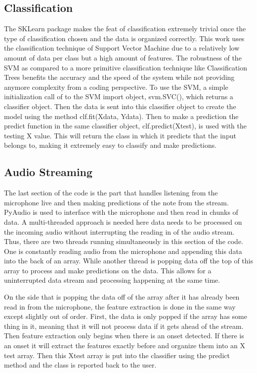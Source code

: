 \documentclass[conference]{IEEEtran}
\begin{document}
\subsection{Classification}
\label{sec:class}

The SKLearn package makes the feat of classification extremely trivial once the type of classification chosen and the data is organized correctly.  This work uses the classification technique of Support Vector Machine due to a relatively low amount of data per class but a high amount of features.  The robustness of the SVM as compared to a more primitive classification technique like Classification Trees benefits the accuracy and the speed of the system while not providing anymore complexity from a coding perspective.  To use the SVM, a simple initialization call of to the SVM import object, svm.SVC(), which returns a classifier object.  Then the data is sent into this classifier object to create the model using the method clf.fit(Xdata, Ydata).  Then to make a prediction the predict function in the same classifier object, clf.predict(Xtest), is used with the testing X value.  This will return the class in which it predicts that the input belongs to, making it extremely easy to classify and make predictions. 

\subsection{Audio Streaming}
\label{sec:stream}
The last section of the code is the part that handles listening from the microphone live and then making predictions of the note from the stream.  PyAudio is used to interface with the microphone and then read in chunks of data.  A multi-threaded approach is needed here data needs to be processed on the incoming audio without interrupting the reading in of the audio stream.  Thus, there are two threads running simultaneously in this section of the code.  One is constantly reading audio from the microphone and appending this data into the back of an array.  While another thread is popping data off the top of this array to process and make predictions on the data.  This allows for a uninterrupted data stream and processing happening at the same time.  

On the side that is popping the data off of the array after it has already been read in from the microphone, the feature extraction is done in the same way except slightly out of order.  First, the data is only popped if the array has some thing in it, meaning that it will not process data if it gets ahead of the stream.  Then feature extraction only begins when there is an onset detected.  If there is an onset it will extract the features exactly before and organize them into an X test array.  Then this Xtest array is put into the classifier using the predict method and the class is reported back to the user.
\end{document}
